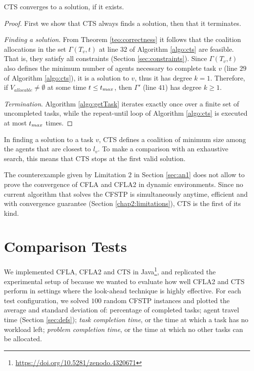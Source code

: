 \begin{theorem}\label{teo:convergence}
    CTS converges to a solution, if it exists.
\end{theorem}
\begin{proof}
    First we show that CTS always finds a solution, then that it terminates.

    \emph{Finding a solution}.
    From Theorem \ref{teo:correctness} it follows that the coalition allocations in the
    set $\Gamma(T_v, t)$ at line $32$ of Algorithm \ref{algo:cts} are feasible. That is,
    they satisfy all constraints (Section \ref{sec:constraints}).
    Since $\Gamma(T_v, t)$ also defines the minimum number of agents necessary to complete
    task $v$ (line $29$ of Algorithm \ref{algo:cts}), it is a solution to $v$, thus it has
    degree $k = 1$.
    Therefore, if $V_{allocable} \neq \emptyset$ at some time $t \leq t_{max}$, then
    $\Gamma'$ (line $41$) has degree $k \geq 1$.

    \emph{Termination}.
    Algorithm \ref{algo:getTask} iterates exactly once over a finite set of uncompleted
    tasks, while the \textsf{repeat-until} loop of Algorithm \ref{algo:cts} is executed at
    most $t_{max}$ times.
\end{proof}
In finding a solution to a task $v$, CTS defines a coalition of minimum size among the
agents that are closest to $l_v$. To make a comparison with an exhaustive search, this
means that CTS stops at the first valid solution.
\iffalse
Let $S_v$ be the set of solutions for $v$. In general, $x$ may not be optimal, but if $S_v
\neq \emptyset$, then $x \in S_v$.
\fi

The counterexample given by Limitation $2$ in Section \ref{sec:an1} does not allow to
prove the convergence of CFLA and CFLA2 in dynamic environments. Since no current
algorithm that solves the CFSTP is simultaneously anytime, efficient and with convergence
guarantee (Section \ref{chap2:limitations}), CTS is the first of its kind.

\section{Comparison Tests}\label{sec:tests}

We implemented CFLA, CFLA2 and CTS in
Java\footnote{\url{https://doi.org/10.5281/zenodo.4320671}}, and replicated the
experimental setup of \cite{ramchurn2010cfstp} because we wanted to evaluate how well
CFLA2 and CTS perform in settings where the look-ahead technique is highly effective. For
each test configuration, we solved $100$ random CFSTP instances and plotted the average
and standard deviation of: percentage of completed tasks; agent travel time
(Section \ref{sec:defs}); \emph{task completion time}, or the time at which a task has no
workload left; \emph{problem completion time}, or the time at which no other tasks can be
allocated.

